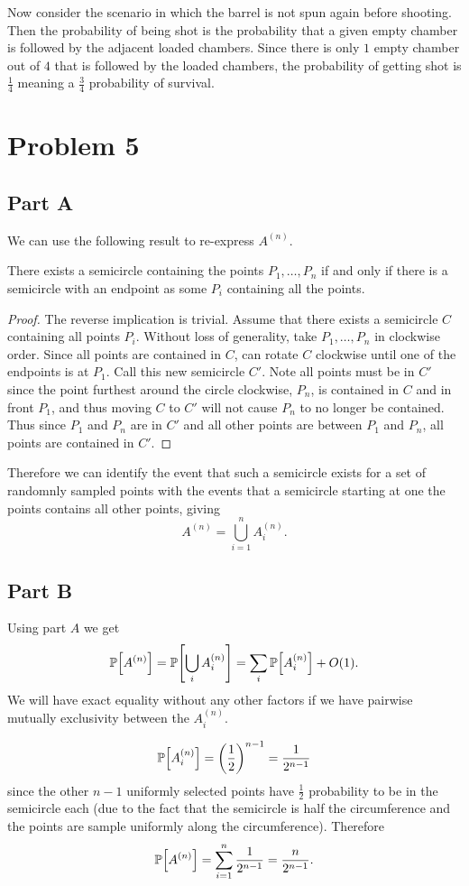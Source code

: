 \documentclass{eeleyes}
\begin{document}
Now consider the scenario in which the barrel is not spun again before shooting. Then the probability of being shot is the probability that a given empty chamber is followed by the adjacent loaded chambers. Since there is only $1$ empty chamber out of $4$ that is followed by the loaded chambers, the probability of getting shot is $\frac{1}{4}$ meaning a $\frac{3}{4}$ probability of survival.

\section*{Problem 5}
\subsection*{Part A}

We can use the following result to re-express $A^{(n)}$.

\begin{theorem}[]
    There exists a semicircle containing the points $P_1, \ldots, P_n$ if and only if there is a semicircle with an endpoint as some $P_i$ containing all the points.
\end{theorem}

\begin{proof}
    The reverse implication is trivial. Assume that there exists a semicircle $C$ containing all points $P_i$. Without loss of generality, take $P_1, \ldots, P_n$ in clockwise order. Since all points are contained in $C$, can rotate $C$ clockwise until one of the endpoints is at $P_1$. Call this new semicircle $C'$. Note all points must be in $C'$ since the point furthest around the circle clockwise, $P_n$, is contained in $C$ and in front $P_1$, and thus moving $C$ to $C'$ will not cause $P_n$ to no longer be contained. Thus since $P_1$ and $P_n$ are in $C'$ and all other points are between $P_1$ and $P_n$, all points are contained in $C'$.
\end{proof}
Therefore we can identify the event that such a semicircle exists for a set of randomnly sampled points with the events that a semicircle starting at one the points contains all other points, giving
\[
    A^{(n)} = \bigcup_{i = 1}^n A_{i}^{(n)}
.\]

\subsection*{Part B}
Using part $A$ we get
\[
    \mathbb{P}\qty[A^{(n)}] = \mathbb{P}\qty[\bigcup_{i} A_{i}^{(n)}] = \sum_{i} \mathbb{P}\qty[A_i^{(n)}] + O(1)
.\]
We will have exact equality without any other factors if we have pairwise mutually exclusivity between the $A_i^{(n)}$. 

\[
    \mathbb{P}\qty[A_i^{(n)}] = \qty(\frac{1}{2})^{n-1} = \frac{1}{2^{n-1}}
\]
since the other $n-1$ uniformly selected points have $\frac{1}{2}$ probability to be in the semicircle each (due to the fact that the semicircle is half the circumference and the points are sample uniformly along the circumference). Therefore
\[
    \mathbb{P}\qty[A^{(n)}] = \sum_{i=1}^n \frac{1}{2^{n-1}} = \frac{n}{2^{n-1}}
.\]
\end{document}
